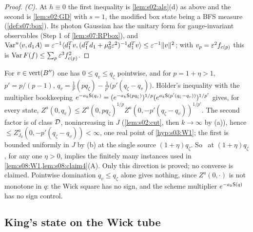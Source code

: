 \begin{proof}
\emph{(C).} At $h\equiv0$ the first inequality is \cref{lem:s02:alg}(d) as above and the second is \cref{lem:s02:GD} with $s=1$, the modified box state being a BFS measure (\cref{def:s07:box}). Its photon Gaussian has the unitary form for gauge-invariant observables (Step 1 of \cref{lem:s07:RPbox}), and $\operatorname{Var}^u\langle v,d_1A\rangle=\varepsilon^{-1}\langle d_1^Tv,(d_1^Td_1+\mu_0^2\varepsilon^2)^{-1}d_1^Tv\rangle\le\varepsilon^{-1}\lVert v\rVert^2$; with $v_p=\varepsilon^2f_{c(p)}$ this is $\operatorname{Var} F(f)\le\sum_p\varepsilon^3f_{c(p)}^2$.
\end{proof}

\begin{remark}\label{rem:s08:oneinstance}
For $v\in\operatorname{vert}(B'')$ one has $0\le q_v\le q_\zeta$ pointwise, and for $p=1+\eta>1$, $p'=p/(p-1)$, $q_v=\frac1p(pq_\zeta)-\frac1{p'}\big(p'(q_\zeta-q_v)\big)$. H\"older's inequality with the multiplier bookkeeping $e^{-a_k\mathsf S(q_v)}=(e^{-a_k\mathsf S(pq_\zeta)})^{1/p}(e^{a_k\mathsf S(p'(q_\zeta-q_v))})^{1/p'}$ gives, for every state, $Z^a(0,q_v)\le Z^a(0,pq_\zeta)^{1/p}Z^a(0,-p'(q_\zeta-q_v))^{1/p'}$. The second factor is of class $\mathcal D$, nonincreasing in $J$ (\cref{lem:s02:cut}, then $k\to\infty$ by \Wtwo(a)), hence $\le Z^a_{J_0}(0,-p'(q_\zeta-q_v))<\infty$, one real point of \cref{hyp:s03:W1}; the first is bounded uniformly in $J$ by \Wtwo(b) at the single source $(1+\eta)q_\zeta$. So \Wtwo\ at $(1+\eta)q_\zeta$, for any one $\eta>0$, implies the finitely many instances used in \cref{lem:s08:W1,lem:s08:claim4}(A). Only this direction is proved; no converse is claimed. Pointwise domination $q_v\le q_\zeta$ alone gives nothing, since $Z^a(0,\cdot)$ is not monotone in $q$: the Wick square has no sign, and the scheme multiplier $e^{-a_k\mathsf S(q)}$ has no sign control.
\end{remark}

\subsection{King's state on the Wick tube}

